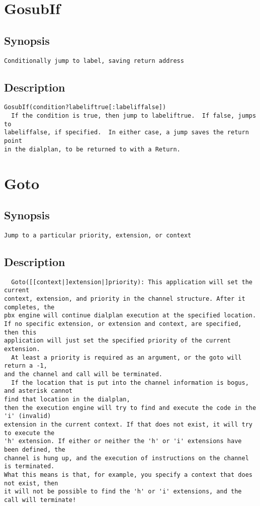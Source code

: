 \section{GosubIf}
\subsection{Synopsis}
\begin{verbatim}
Conditionally jump to label, saving return address
\end{verbatim}
\subsection{Description}
\begin{verbatim}
GosubIf(condition?labeliftrue[:labeliffalse])
  If the condition is true, then jump to labeliftrue.  If false, jumps to
labeliffalse, if specified.  In either case, a jump saves the return point
in the dialplan, to be returned to with a Return.

\end{verbatim}


\section{Goto}
\subsection{Synopsis}
\begin{verbatim}
Jump to a particular priority, extension, or context
\end{verbatim}
\subsection{Description}
\begin{verbatim}
  Goto([[context|]extension|]priority): This application will set the current
context, extension, and priority in the channel structure. After it completes, the
pbx engine will continue dialplan execution at the specified location.
If no specific extension, or extension and context, are specified, then this
application will just set the specified priority of the current extension.
  At least a priority is required as an argument, or the goto will return a -1,
and the channel and call will be terminated.
  If the location that is put into the channel information is bogus, and asterisk cannot
find that location in the dialplan,
then the execution engine will try to find and execute the code in the 'i' (invalid)
extension in the current context. If that does not exist, it will try to execute the
'h' extension. If either or neither the 'h' or 'i' extensions have been defined, the
channel is hung up, and the execution of instructions on the channel is terminated.
What this means is that, for example, you specify a context that does not exist, then
it will not be possible to find the 'h' or 'i' extensions, and the call will terminate!

\end{verbatim}


